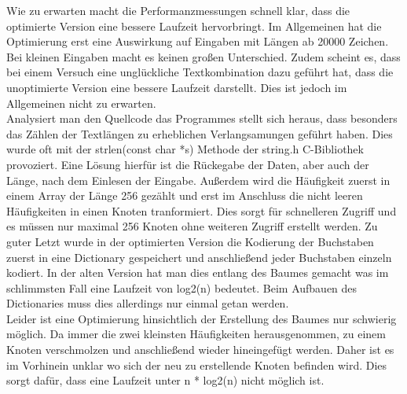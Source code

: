 \documentclass[course=erap]{aspdoc}
\begin{document}
\begin{center}
\end{center}
Wie zu erwarten macht die Performanzmessungen schnell klar, dass die optimierte Version eine bessere Laufzeit hervorbringt. Im Allgemeinen hat die Optimierung erst eine Auswirkung auf Eingaben mit Längen ab 20000 Zeichen. Bei kleinen Eingaben macht es keinen großen Unterschied. Zudem scheint es, dass bei einem Versuch eine unglückliche Textkombination dazu geführt hat, dass die unoptimierte Version eine bessere Laufzeit darstellt. Dies ist jedoch im Allgemeinen nicht zu erwarten.\\
Analysiert man den Quellcode das Programmes stellt sich heraus, dass besonders das Zählen der Textlängen zu erheblichen Verlangsamungen geführt haben. Dies wurde oft mit der strlen(const char *s) Methode der string.h C-Bibliothek provoziert. Eine Lösung hierfür ist die Rückegabe der Daten, aber auch der Länge, nach dem Einlesen der Eingabe. Außerdem wird die Häufigkeit zuerst in einem Array der Länge 256 gezählt und erst im Anschluss die nicht leeren Häufigkeiten in einen Knoten tranformiert. Dies sorgt für schnelleren Zugriff und es müssen nur maximal 256 Knoten ohne weiteren Zugriff erstellt werden. Zu guter Letzt wurde in der optimierten Version die Kodierung der Buchstaben zuerst in eine Dictionary gespeichert und anschließend jeder Buchstaben einzeln kodiert. In der alten Version hat man dies entlang des Baumes gemacht was im schlimmsten Fall eine Laufzeit von log2(n) bedeutet. Beim Aufbauen des Dictionaries muss dies allerdings nur einmal getan werden.\\
Leider ist eine Optimierung hinsichtlich der Erstellung des Baumes nur schwierig möglich. Da immer die zwei kleinsten Häufigkeiten herausgenommen, zu einem Knoten verschmolzen und anschließend wieder hineingefügt werden. Daher ist es im Vorhinein unklar wo sich der neu zu erstellende Knoten befinden wird. Dies sorgt dafür, dass eine Laufzeit unter n * log2(n) nicht möglich ist.
\end{document}
